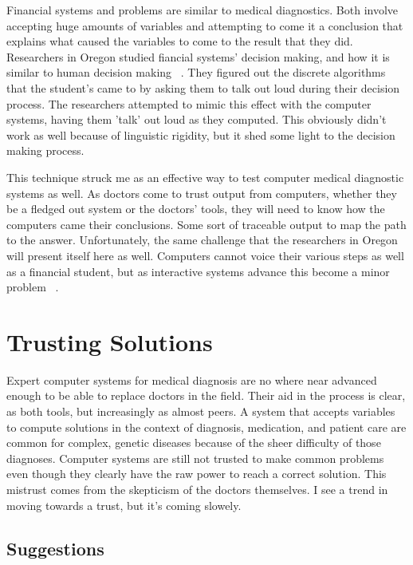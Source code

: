 \documentclass[11pt]{article}
\newcommand{\tab}{\hspace*{2em}}
\begin{document}
\begin{doublespace}
\tab Financial systems and problems are similar to medical diagnostics. Both involve accepting huge amounts of variables and attempting to come it a conclusion that explains what caused the variables to come to the result that they did. Researchers in Oregon studied fiancial systems' decision making, and how it is similar to human decision making ~\cite{doi:10.1287/mnsc.29.6.653}. They figured out the discrete algorithms that the student's came to by asking them to talk out loud during their decision process. The researchers attempted to mimic this effect with the computer systems, having them 'talk' out loud as they computed. This obviously didn't work as well because of linguistic rigidity, but it shed some light to the decision making process.

\tab This technique struck me as an effective way to test computer medical diagnostic systems as well. As doctors come to trust output from computers, whether they be a fledged out system or the doctors' tools, they will need to know how the computers came their conclusions. Some sort of traceable output to map the path to the answer. Unfortunately, the same challenge that the researchers in Oregon will present itself here as well. Computers cannot voice their various steps as well as a financial student, but as interactive systems advance this become a minor problem ~\cite{doi:10.1287/mnsc.29.6.653}.

\section{Trusting Solutions}

\tab Expert computer systems for medical diagnosis are no where near advanced enough to be able to replace doctors in the field. Their aid in the process is clear, as both tools, but increasingly as almost peers. A system that accepts variables to compute solutions in the context of diagnosis, medication, and patient care are common for complex, genetic diseases because of the sheer difficulty of those diagnoses. Computer systems are still not trusted to make common problems even though they clearly have the raw power to reach a correct solution. This mistrust comes from the skepticism of the doctors themselves. I see a trend in moving towards a trust, but it's coming slowely.

\subsection{Suggestions}


\end{doublespace}
\end{document}
